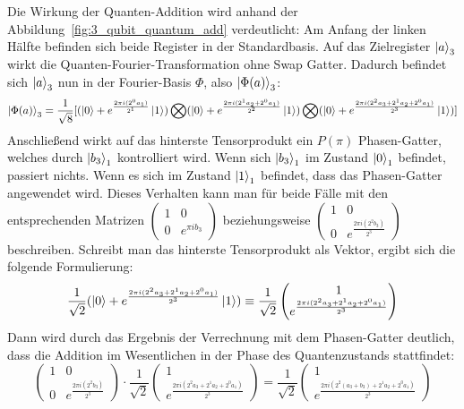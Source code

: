 Die Wirkung der Quanten-Addition wird anhand der Abbildung~\ref*{fig:3_qubit_quantum_add} verdeutlicht:
Am Anfang der linken Hälfte befinden sich beide Register in der Standardbasis.
Auf das Zielregister \(\ket{a}_3\) wirkt die Quanten-Fourier-Transformation ohne Swap Gatter.
Dadurch befindet sich \(\ket{a}_3\) nun in der Fourier-Basis \(\Phi\), also \(\ket{\Phi(a)}_3\):
\[\ket{\Phi(a)}_3 = \frac{1}{\sqrt{8}} [ (\ket{0} + { e^{\frac{2 \pi i (2^0a_1)}{2^1}}}\ket{1} ) \operatorname{\bigotimes}
( \ket{0} + { e^{\frac{2 \pi i (2^1a_2+2^0a_1)}{2^2}}}\ket{1} ) \operatorname{\bigotimes}
( \ket{0} + { e^{\frac{2 \pi i (2^{2}a_3 +2^1a_2+2^0a_1)}{2^3}}}\ket{1} ) ] \]
Anschließend wirkt auf das hinterste Tensorprodukt ein \(P(\pi)\) Phasen-Gatter,
welches durch \(\ket{b_3}_1\) kontrolliert wird.
Wenn sich \(\ket{b_3}_1\) im Zustand \(\ket{0}_1\) befindet, passiert nichts.
Wenn es sich im Zustand \(\ket{1}_1\) befindet, dass das Phasen-Gatter angewendet wird.
Dieses Verhalten kann man für beide Fälle mit den entsprechenden Matrizen 
\(\begin{pmatrix}
    1 & 0 \\
    0 & e^{\pi i b_3}
  \end{pmatrix}\)
  beziehungsweise  
  \(\begin{pmatrix}
    1 & 0 \\
    0 & e^{\frac{2\pi i (2^2b_3)}{2^3}}
  \end{pmatrix}\)
beschreiben.
Schreibt man das hinterste Tensorprodukt als Vektor, ergibt sich die folgende Formulierung:
\[\frac{1}{\sqrt{2}}( \ket{0} + { e^{\frac{2 \pi i (2^{2}a_3 +2^1a_2+2^0a_1)}{2^3}}}\ket{1}) \equiv
\frac{1}{\sqrt{2}}
\begin{pmatrix}
     1  \\
     e^{\frac{2 \pi i (2^{2}a_3 +2^1a_2+2^0a_1)}{2^3}}
  \end{pmatrix}
    \]
Dann wird durch das Ergebnis der Verrechnung mit dem Phasen-Gatter deutlich, 
dass die Addition im Wesentlichen in der Phase des Quantenzustands stattfindet:
\[\begin{pmatrix}
    1 & 0 \\
    0 & e^{\frac{2\pi i (2^2b_3)}{2^3}}
  \end{pmatrix}
    \cdot
\frac{1}{\sqrt{2}}
\begin{pmatrix}
    1  \\
     e^{\frac{2 \pi i (2^{2}a_3 +2^1a_2+2^0a_1)}{2^3}}
  \end{pmatrix}
  =
  \frac{1}{\sqrt{2}}
  \begin{pmatrix}
    1  \\
     e^{\frac{2 \pi i (2^{2}(a_3+b_3) +2^1a_2+2^0a_1)}{2^3}}
  \end{pmatrix}
\]
